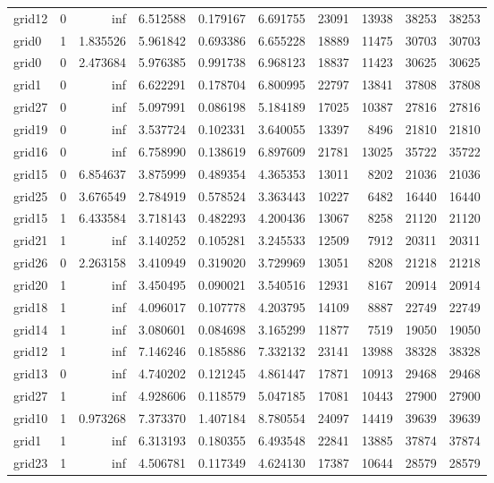 \begin{longtable}{|l|r|r|r|r|r|r|r|r|r|}
grid12 & 0 & inf & 6.512588 & 0.179167 & 6.691755 & 23091 & 13938 & 38253 & 38253 \\
grid0 & 1 & 1.835526 & 5.961842 & 0.693386 & 6.655228 & 18889 & 11475 & 30703 & 30703 \\
grid0 & 0 & 2.473684 & 5.976385 & 0.991738 & 6.968123 & 18837 & 11423 & 30625 & 30625 \\
grid1 & 0 & inf & 6.622291 & 0.178704 & 6.800995 & 22797 & 13841 & 37808 & 37808 \\
grid27 & 0 & inf & 5.097991 & 0.086198 & 5.184189 & 17025 & 10387 & 27816 & 27816 \\
grid19 & 0 & inf & 3.537724 & 0.102331 & 3.640055 & 13397 & 8496 & 21810 & 21810 \\
grid16 & 0 & inf & 6.758990 & 0.138619 & 6.897609 & 21781 & 13025 & 35722 & 35722 \\
grid15 & 0 & 6.854637 & 3.875999 & 0.489354 & 4.365353 & 13011 & 8202 & 21036 & 21036 \\
grid25 & 0 & 3.676549 & 2.784919 & 0.578524 & 3.363443 & 10227 & 6482 & 16440 & 16440 \\
grid15 & 1 & 6.433584 & 3.718143 & 0.482293 & 4.200436 & 13067 & 8258 & 21120 & 21120 \\
grid21 & 1 & inf & 3.140252 & 0.105281 & 3.245533 & 12509 & 7912 & 20311 & 20311 \\
grid26 & 0 & 2.263158 & 3.410949 & 0.319020 & 3.729969 & 13051 & 8208 & 21218 & 21218 \\
grid20 & 1 & inf & 3.450495 & 0.090021 & 3.540516 & 12931 & 8167 & 20914 & 20914 \\
grid18 & 1 & inf & 4.096017 & 0.107778 & 4.203795 & 14109 & 8887 & 22749 & 22749 \\
grid14 & 1 & inf & 3.080601 & 0.084698 & 3.165299 & 11877 & 7519 & 19050 & 19050 \\
grid12 & 1 & inf & 7.146246 & 0.185886 & 7.332132 & 23141 & 13988 & 38328 & 38328 \\
grid13 & 0 & inf & 4.740202 & 0.121245 & 4.861447 & 17871 & 10913 & 29468 & 29468 \\
grid27 & 1 & inf & 4.928606 & 0.118579 & 5.047185 & 17081 & 10443 & 27900 & 27900 \\
grid10 & 1 & 0.973268 & 7.373370 & 1.407184 & 8.780554 & 24097 & 14419 & 39639 & 39639 \\
grid1 & 1 & inf & 6.313193 & 0.180355 & 6.493548 & 22841 & 13885 & 37874 & 37874 \\
grid23 & 1 & inf & 4.506781 & 0.117349 & 4.624130 & 17387 & 10644 & 28579 & 28579 \\

\end{longtable}
